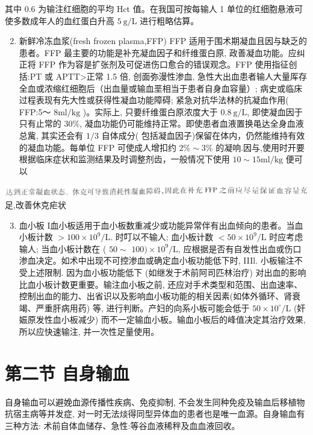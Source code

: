 \documentclass[10pt]{article}
\begin{document}
其中 0.6 为输注红细胞的平均 Hct 值。在我国可按每输人 1 单位的红细胞悬液可使多数成年人的血红蛋白升高 $5 \mathrm{~g} / \mathrm{L}$ 进行粗略估算。

\begin{enumerate}
  \setcounter{enumi}{1}
  \item 新鲜冷冻血浆(fresh frozen plasma,FFP) FFP 适用于围术期凝血且因与缺乏的患者。FFP 最主要的功能是补充凝血因子和纤维蛋白原, 政善凝血功能。应纠正将 FFP 作为容是扩张剂及可促进伤口愈合的错误观念。FFP 使用指征创括:PT 或 APTT>正常 1.5 倍, 创面弥漫性渗血, 急性大出血患者输人大量厍存全血或浓缩红细胞后（出血量或输血垩相当于患者自身血容量）; 病史或临床过程表现有先大性或获得性凝血功能障碍; 紧急对抗华法林的抗凝血作用( FFP:5～ $8 \mathrm{ml} / \mathrm{kg}$ )。实际上, 只要纤维蛋白原浓度大于 $0.8 \mathrm{~g} / \mathrm{L}$, 即使凝血因于只有止常的 $30 \%$, 凝血功能仍可能维持正常。即使患者血液置换黾达全身血液总歶, 其实还会有 $1 / 3$ 自体成分( 包括凝血因子)保留在体内，仍然能维持有效的凝血功能。每单位 FFP 可使成人增扣约 $2 \% \sim 3 \%$ 的凝响.因与,使用时开要根据临床症状和监测结果及时调整剂齿，一般情况下使用 $10 \sim 15 \mathrm{ml} / \mathrm{kg}$ 便可以
\end{enumerate}

\includegraphics[max width=\textwidth, center]{2024_07_09_002a177993bd97d1d6d7g-187(1)}\\
足,改善休克疟状

\begin{enumerate}
  \setcounter{enumi}{2}
  \item 血小板 I血小板适用于血小板数重减少或功能异常伴有出血倾向的患者。当血小板计数 $>100 \times 10^{9} / \mathrm{L}$. 时叮以不输人; 血小板计数 $<50 \times 10^{9} / \mathrm{L}$ 时应考虑输人; 当血小板计数在 ( $50 \sim$ $100) \times 10^{9} / \mathrm{L}$, 应根据是否有自发性出血或伤口渗血决定。如术中出现不可控渗血或确定血小板功能低下时, IIIl. 小板输注不受上述限制. 因为血小板功能低下 (如继发于术前阿司匹林治疗) 对出血的影响比血小板计数更重要。输注血小板之前, 还应对手术类型和范围、出血速率、控制出血的能力、出省识以及影响血小板功能的相关因素(如体外循环、肾衰竭、严重肝病用药) 等, 进行判断。产妇的向系小板可能会低于 $50 \times 10^{\circ} / \mathrm{L}$ (奸娠原发性血小板减少) 而不一定输血小板。输血小板后的峰值决定其治疗效果, 所以应快速输注, 并一次性足量使用。
\end{enumerate}

\section*{第二节 自身输血}
自身输血可以避娩血源传播性疾病、免疫抑制, 不会发生同种免疫及输血后移植物抗宿主病等并发症, 对一时无法㷋得同型异体血的患者也是唯一血源。自身输血有三种方法: 术前自体血储存、急性:等谷血液稀秚及血血液回收。
\end{document}
